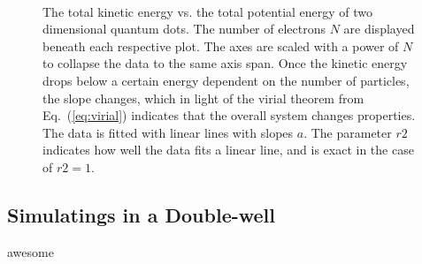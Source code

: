 \begin{figure}[h]
 \begin{center}
   \\
  \caption{The total kinetic energy vs. the total potential energy of two dimensional quantum dots. The number of electrons $N$ are displayed beneath each respective plot. The axes are scaled with a power of $N$ to collapse the data to the same axis span. Once the kinetic energy drops below a certain energy dependent on the number of particles, the slope changes, which in light of the virial theorem from Eq.~(\ref{eq:virial}) indicates that the overall system changes properties. The data is fitted with linear lines with slopes $a$. The parameter $r2$ indicates how well the data fits a linear line, and is exact in the case of $r2 = 1$.}
  \label{fig:V_dist_qdots}
 \end{center}
\end{figure}
\captionsetup[subfloat]{labelformat=parens}

\subsection{Simulatings in a Double-well}

awesome